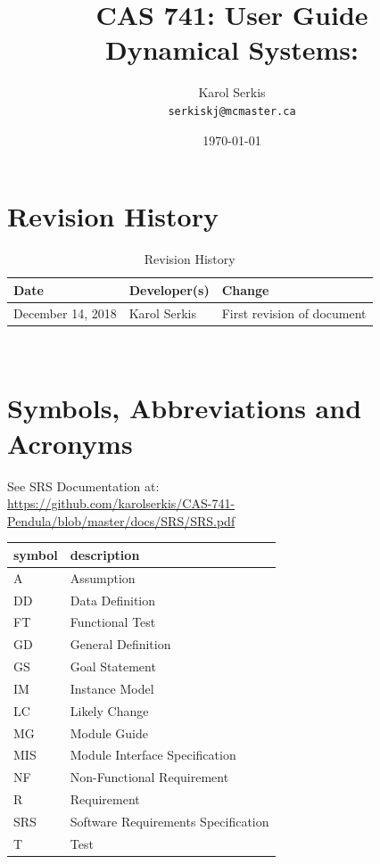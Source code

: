 \documentclass[12pt, titlepage]{article}
\begin{document}
\title{CAS 741: User Guide\\[10pt]
\Large Dynamical Systems: \progname}
\author{Karol Serkis\\\texttt{serkiskj@mcmaster.ca}}

\date{\today}
	
\maketitle


\section{Revision History}

\begin{table}[hp]
\caption{Revision History} \label{TblRevisionHistory}
\begin{tabularx}{\textwidth}{llX}
\toprule
\textbf{Date} & \textbf{Developer(s)} & \textbf{Change}\\
\midrule
December 14, 2018 & Karol Serkis & First revision of document\\
\bottomrule
\end{tabularx}
\end{table}

~\newpage

\section{Symbols, Abbreviations and Acronyms}

See SRS Documentation at:\\
\url{https://github.com/karolserkis/CAS-741-Pendula/blob/master/docs/SRS/SRS.pdf}\\


\renewcommand{\arraystretch}{1.2}
\begin{tabular}{l l} 
  \toprule		
  \textbf{symbol} & \textbf{description}\\
  \midrule 
  A & Assumption\\
  DD & Data Definition\\
  FT & Functional Test \\
  GD & General Definition\\
  GS & Goal Statement\\
  IM & Instance Model\\
  LC & Likely Change\\
  MG & Module Guide\\ 
  MIS & Module Interface Specification\\ 
  NF & Non-Functional Requirement\\
  R & Requirement\\
  SRS & Software Requirements Specification\\
  T & Test\\
  \bottomrule
\end{tabular}\\
\end{document}
